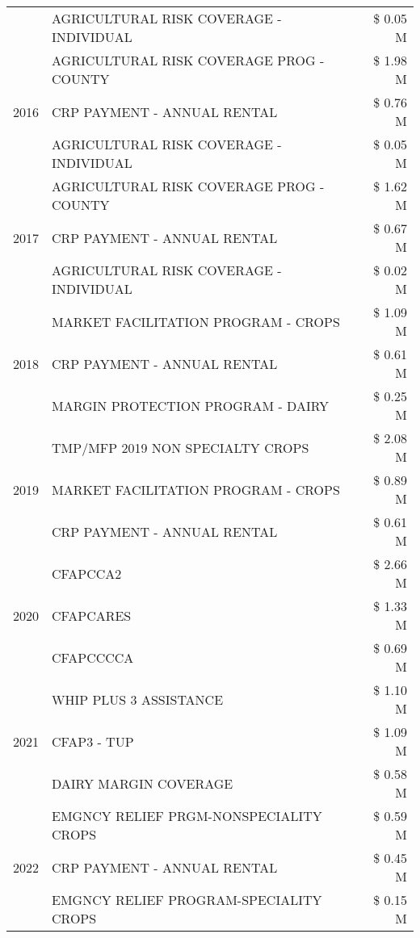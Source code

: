 \begin{tabular}{llr}
 & AGRICULTURAL RISK COVERAGE - INDIVIDUAL & \$ 0.05 M \\
\cline{1-3}
\multirow[t]{3}{*}{2016} & AGRICULTURAL RISK COVERAGE PROG - COUNTY & \$ 1.98 M \\
 & CRP PAYMENT - ANNUAL RENTAL & \$ 0.76 M \\
 & AGRICULTURAL RISK COVERAGE - INDIVIDUAL & \$ 0.05 M \\
\cline{1-3}
\multirow[t]{3}{*}{2017} & AGRICULTURAL RISK COVERAGE PROG - COUNTY & \$ 1.62 M \\
 & CRP PAYMENT - ANNUAL RENTAL & \$ 0.67 M \\
 & AGRICULTURAL RISK COVERAGE - INDIVIDUAL & \$ 0.02 M \\
\cline{1-3}
\multirow[t]{3}{*}{2018} & MARKET FACILITATION PROGRAM - CROPS & \$ 1.09 M \\
 & CRP PAYMENT - ANNUAL RENTAL & \$ 0.61 M \\
 & MARGIN PROTECTION PROGRAM - DAIRY & \$ 0.25 M \\
\cline{1-3}
\multirow[t]{3}{*}{2019} & TMP/MFP 2019 NON SPECIALTY CROPS & \$ 2.08 M \\
 & MARKET FACILITATION PROGRAM - CROPS & \$ 0.89 M \\
 & CRP PAYMENT - ANNUAL RENTAL & \$ 0.61 M \\
\cline{1-3}
\multirow[t]{3}{*}{2020} & CFAPCCA2 & \$ 2.66 M \\
 & CFAPCARES & \$ 1.33 M \\
 & CFAPCCCCA & \$ 0.69 M \\
\cline{1-3}
\multirow[t]{3}{*}{2021} & WHIP PLUS 3 ASSISTANCE & \$ 1.10 M \\
 & CFAP3 - TUP & \$ 1.09 M \\
 & DAIRY MARGIN COVERAGE & \$ 0.58 M \\
\cline{1-3}
\multirow[t]{3}{*}{2022} & EMGNCY RELIEF PRGM-NONSPECIALITY CROPS & \$ 0.59 M \\
 & CRP PAYMENT - ANNUAL RENTAL & \$ 0.45 M \\
 & EMGNCY RELIEF PROGRAM-SPECIALITY CROPS & \$ 0.15 M \\
\cline{1-3}
\bottomrule
\end{tabular}
